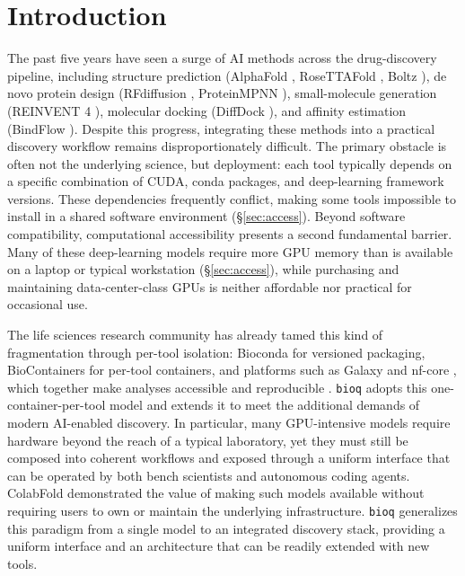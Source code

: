 \documentclass[webpdf,contemporary,large,namedate]{oup-authoring-template}%
\begin{document}
\section{Introduction}\label{sec:intro}

The past five years have seen a surge of AI methods across the
drug-discovery pipeline, including structure prediction (AlphaFold
\citep{jumper_highly_2021,abramson_accurate_2024}, RoseTTAFold
\citep{baek_accurate_2021}, Boltz \citep{wohlwend_boltz-1_2024}), de
novo protein design (RFdiffusion \citep{watson_novo_2023}, ProteinMPNN
\citep{dauparas_robust_2022}), small-molecule generation (REINVENT 4
\citep{loeffler_reinvent_2024}), molecular docking (DiffDock
\citep{corso_diffdock_2023}), and affinity estimation (BindFlow
\citep{leon_bindflow_2026}). Despite this progress, integrating these
methods into a practical discovery workflow remains disproportionately
difficult. The primary obstacle is often not the underlying science,
but deployment: each tool typically depends on a specific combination
of CUDA, conda packages, and deep-learning framework versions. These
dependencies frequently conflict, making some tools impossible to
install in a shared software environment (\S\ref{sec:access}). Beyond
software compatibility, computational accessibility presents a second
fundamental barrier. Many of these deep-learning models require more
GPU memory than is available on a laptop or typical workstation
(\S\ref{sec:access}), while purchasing and maintaining
data-center-class GPUs is neither affordable nor practical for
occasional use.

The life sciences research community has already tamed this kind of
fragmentation through per-tool isolation: Bioconda
\citep{the_bioconda_team_bioconda_2018} for versioned packaging,
BioContainers \citep{da_veiga_leprevost_biocontainers_2017} for
per-tool containers, and platforms such as Galaxy
\citep{the_galaxy_community_galaxy_2026} and nf-core
\citep{langer_empowering_2025}, which together make analyses
accessible and reproducible
\citep{gruning_practical_2018}. \texttt{bioq} adopts this
one-container-per-tool model and extends it to meet the additional
demands of modern AI-enabled discovery. In particular, many
GPU-intensive models require hardware beyond the reach of a typical
laboratory, yet they must still be composed into coherent workflows
and exposed through a uniform interface that can be operated by both
bench scientists and autonomous coding agents. ColabFold
\citep{mirdita_colabfold_2022} demonstrated the value of making such
models available without requiring users to own or maintain the
underlying infrastructure. \texttt{bioq} generalizes this paradigm
from a single model to an integrated discovery stack, providing a
uniform interface and an architecture that can be readily extended
with new tools.
\end{document}
